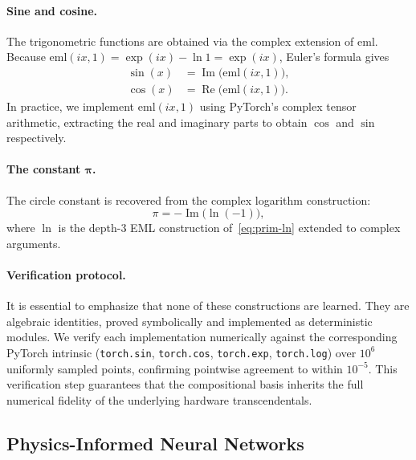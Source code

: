 \paragraph{Sine and cosine.}
The trigonometric functions are obtained via the complex extension of
$\mathrm{eml}$.  Because $\mathrm{eml}(ix, 1) = \exp(ix) - \ln 1 = \exp(ix)$,
Euler's formula gives
\begin{align}
  \sin(x) &= \operatorname{Im}\!\big(\mathrm{eml}(ix, 1)\big),
    \label{eq:prim-sin}\\
  \cos(x) &= \operatorname{Re}\!\big(\mathrm{eml}(ix, 1)\big).
    \label{eq:prim-cos}
\end{align}
In practice, we implement $\mathrm{eml}(ix, 1)$ using PyTorch's complex tensor
arithmetic, extracting the real and imaginary parts to obtain $\cos$ and $\sin$
respectively.

\paragraph{The constant $\boldsymbol{\pi}$.}
The circle constant is recovered from the complex logarithm construction:
\begin{equation}
  \pi = -\operatorname{Im}\!\big(\ln(-1)\big),
  \label{eq:prim-pi}
\end{equation}
where $\ln$ is the depth-3 EML construction of~\eqref{eq:prim-ln} extended to
complex arguments.

\paragraph{Verification protocol.}
It is essential to emphasize that none of these constructions are learned.
They are algebraic identities, proved symbolically and implemented as
deterministic modules.  We verify each implementation numerically against the
corresponding PyTorch intrinsic (\texttt{torch.sin}, \texttt{torch.cos},
\texttt{torch.exp}, \texttt{torch.log}) over $10^{6}$ uniformly sampled
points, confirming pointwise agreement to within $10^{-5}$.  This verification
step guarantees that the compositional basis inherits the full numerical
fidelity of the underlying hardware transcendentals.

\subsection{Physics-Informed Neural Networks}
\label{sec:pinns}

